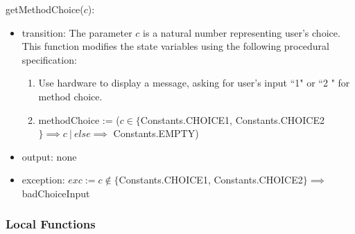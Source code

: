 \documentclass[12pt, titlepage]{article}
\begin{document}
\noindent getMethodChoice($c$):
\begin{itemize}
\item transition:
The parameter $c$ is a natural number representing user's choice. This function
modifies the state variables using the following procedural specification:
\begin{enumerate}
    \item
Use hardware to display a message, asking for user's input ``1" or ``2 " for
method choice.
    \item
methodChoice := ($c \in \{$Constants.CHOICE1, Constants.CHOICE2$\} \implies c\
|\ else \implies$ Constants.EMPTY)
\end{enumerate}
\item output: none
\item exception: $exc := c \not\in \{$Constants.CHOICE1, Constants.CHOICE2$\}
\implies$ badChoiceInput
\end{itemize}

\subsubsection{Local Functions}
\end{document}
